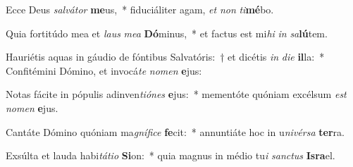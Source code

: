 \item Ecce Deus \textit{sal}\textit{vá}\textit{tor} \textbf{me}us,~* fiduciáliter agam, \textit{et} \textit{non} \textit{ti}\textbf{mé}bo.
\item Quia fortitúdo mea et \textit{laus} \textit{me}\textit{a} \textbf{Dó}minus,~* et factus est mi\textit{hi} \textit{in} \textit{sa}\textbf{lú}tem.
\item Hauriétis aquas in gáudio de fóntibus Salvatóris:~† et dicétis \textit{in} \textit{di}\textit{e} \textbf{il}la:~* Confitémini Dómino, et invocá\textit{te} \textit{no}\textit{men} \textbf{e}jus:
\item Notas fácite in pópulis adinven\textit{ti}\textit{ó}\textit{nes} \textbf{e}jus:~* mementóte quóniam excélsum \textit{est} \textit{no}\textit{men} \textbf{e}jus.
\item Cantáte Dómino quóniam ma\textit{gní}\textit{fi}\textit{ce} \textbf{fe}cit:~* annuntiáte hoc in u\textit{ni}\textit{vér}\textit{sa} \textbf{ter}ra.
\item Exsúlta et lauda habi\textit{tá}\textit{ti}\textit{o} \textbf{Si}on:~* quia magnus in médio tu\textit{i} \textit{sanc}\textit{tus} \textbf{Is}\textbf{ra}el.
